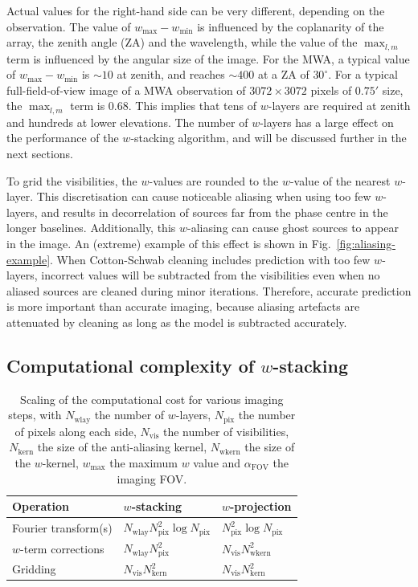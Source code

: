\documentclass[useAMS,usenatbib]{mn2e}
\newcommand{\editmark}[1]{#1}
\begin{document}
Actual values for the right-hand side can be very different, depending on the observation. The value of $w_{\max} - w_{\min}$ is influenced by the coplanarity of the array, the zenith angle (ZA) and the wavelength, while the value of the $\max_{l,m}$ term is influenced by the angular size of the image. For the MWA, a typical value of $w_{\max} - w_{\min}$ is $\sim 10$ at zenith, and reaches $\sim 400$ at a ZA of $30^{\circ}$. For a typical full-field-of-view image of a MWA observation of $3072\times 3072$ pixels of $0.75'$ size, the $\max_{l,m}$ term is $0.68$. This implies that tens of $w$-layers are required at zenith and hundreds at lower elevations. The number of $w$-layers has a large effect on the performance of the $w$-stacking algorithm, and will be discussed further in the next sections.

To grid the visibilities, the $w$-values are rounded to the $w$-value of the nearest $w$-layer. This discretisation can cause noticeable aliasing when using too few $w$-layers, and results in decorrelation of sources far from the phase centre in the longer baselines. Additionally, this $w$-aliasing can cause ghost sources to appear in the image. An (extreme) example of this effect is shown in Fig.~\ref{fig:aliasing-example}. When Cotton-Schwab cleaning includes prediction with too few $w$-layers, incorrect values will be subtracted from the visibilities even when no aliased sources are cleaned during minor iterations. Therefore, accurate prediction is more important than accurate imaging, because aliasing artefacts are attenuated by cleaning as long as the model is subtracted accurately.

\subsection{\editmark{Computational} complexity of $w$-stacking} \label{sec:time-complexity}
\begin{table}
 \caption{Scaling of the computational cost for various imaging steps, with $N_\textrm{wlay}$ the number of $w$-layers, $N_\textrm{pix}$ the number of pixels along each side, $N_\textrm{vis}$ the number of visibilities, $N_\textrm{kern}$ the size of the anti-aliasing kernel, $N_\textrm{wkern}$ the size of the $w$-kernel, $w_{\max}$ the maximum $w$ value and $\alpha_\textrm{FOV}$ the imaging FOV.} \label{tbl:computational-cost-per-operation}
 \begin{tabular}{lll}
   \textbf{Operation} & \textbf{$w$-stacking} & \textbf{$w$-projection} \\
   \hline\hline
   Fourier transform(s) & $N_\textrm{wlay} N^2_\textrm{pix} \log N_\textrm{pix}$ & $N^2_\textrm{pix} \log N_\textrm{pix}$ \\
   $w$-term corrections   & $N_\textrm{wlay} N^2_\textrm{pix}$ & $N_\textrm{vis} N^2_\textrm{wkern}$ \\
   Gridding & $N_\textrm{vis}N^2_\textrm{kern}$ & $N_\textrm{vis} N_\textrm{kern}^2$ \\
   \hline\hline
 \end{tabular}
\end{table}
\end{document}
